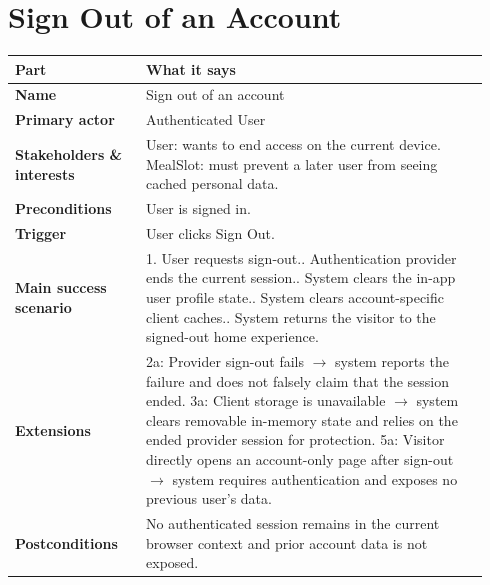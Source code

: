 \documentclass[11pt,twocolumn]{article}
\newcommand{\ucheader}{%
\textbf{Part} & \textbf{What it says} \\
\hline
\endhead
\hline
\endfoot
}
\begin{document}
\section{Sign Out of an Account}
{\footnotesize
\begin{longtable}{@{}p{0.26\linewidth}p{0.68\linewidth}@{}}
\hline
\ucheader
\textbf{Name} & Sign out of an account \\
\hline
\textbf{Primary actor} & Authenticated User \\
\hline
\textbf{Stakeholders \& interests} & User: wants to end access on the current device. MealSlot: must prevent a later user from seeing cached personal data. \\
\hline
\textbf{Preconditions} & User is signed in. \\
\hline
\textbf{Trigger} & User clicks Sign Out. \\
\hline
\textbf{Main success scenario} & 1. User requests sign-out.\newline
2. Authentication provider ends the current session.\newline
3. System clears the in-app user profile state.\newline
4. System clears account-specific client caches.\newline
5. System returns the visitor to the signed-out home experience. \\
\hline
\textbf{Extensions} & 2a: Provider sign-out fails $\rightarrow$ system reports the failure and does not falsely claim that the session ended.\newline
3a: Client storage is unavailable $\rightarrow$ system clears removable in-memory state and relies on the ended provider session for protection.\newline
5a: Visitor directly opens an account-only page after sign-out $\rightarrow$ system requires authentication and exposes no previous user's data. \\
\hline
\textbf{Postconditions} & No authenticated session remains in the current browser context and prior account data is not exposed. \\
\hline
\end{longtable}
}
\end{document}
